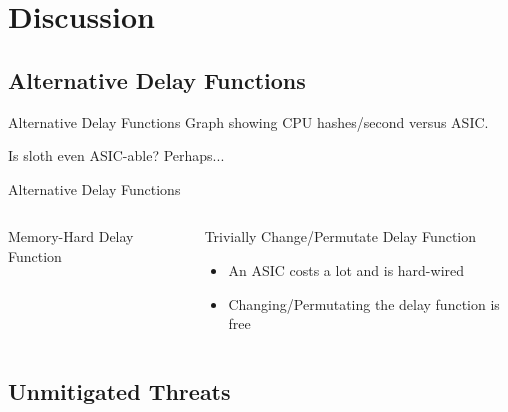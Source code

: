 \section{Discussion}

\subsection{Alternative Delay Functions}

\begin{frame}{Alternative Delay Functions}
    \centering
    Graph showing CPU hashes/second versus ASIC.
    
    Is sloth even ASIC-able? Perhaps...
\end{frame}

\begin{frame}{Alternative Delay Functions}
    \centering
    \begin{columns}[T, onlytextwidth]
        \begin{block}{Memory-Hard Delay Function}
            
        \end{block}

        \begin{block}{Trivially Change/Permutate Delay Function}
            \begin{itemize}
                \item An ASIC costs a lot and is hard-wired
                \item Changing/Permutating the delay function is free
            \end{itemize}
        \end{block}
    \end{columns}
\end{frame}


\subsection{Unmitigated Threats}

